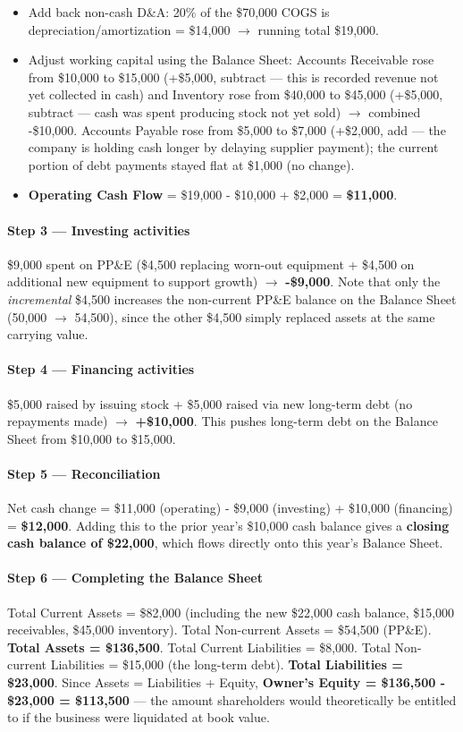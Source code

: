 \documentclass[12pt,openany]{book}
\begin{document}
\begin{itemize}[leftmargin=*]
    \item Add back non-cash D\&A: 20\% of the \$70,000 COGS is depreciation/amortization = \$14,000 \(\to\) running total \$19,000.
    \item Adjust working capital using the Balance Sheet: Accounts Receivable rose from \$10,000 to \$15,000 (+\$5,000, subtract --- this is recorded revenue not yet collected in cash) and Inventory rose from \$40,000 to \$45,000 (+\$5,000, subtract --- cash was spent producing stock not yet sold) \(\to\) combined -\$10,000. Accounts Payable rose from \$5,000 to \$7,000 (+\$2,000, add --- the company is holding cash longer by delaying supplier payment); the current portion of debt payments stayed flat at \$1,000 (no change).
    \item \textbf{Operating Cash Flow} = \$19,000 - \$10,000 + \$2,000 = \textbf{\$11,000}.
\end{itemize}

\paragraph{Step 3 --- Investing activities} \$9,000 spent on PP\&E (\$4,500 replacing worn-out equipment + \$4,500 on additional new equipment to support growth) \(\to\) \textbf{-\$9,000}. Note that only the \emph{incremental} \$4,500 increases the non-current PP\&E balance on the Balance Sheet (50,000 \(\to\) 54,500), since the other \$4,500 simply replaced assets at the same carrying value.

\paragraph{Step 4 --- Financing activities} \$5,000 raised by issuing stock + \$5,000 raised via new long-term debt (no repayments made) \(\to\) \textbf{+\$10,000}. This pushes long-term debt on the Balance Sheet from \$10,000 to \$15,000.

\paragraph{Step 5 --- Reconciliation} Net cash change = \$11,000 (operating) - \$9,000 (investing) + \$10,000 (financing) = \textbf{\$12,000}. Adding this to the prior year's \$10,000 cash balance gives a \textbf{closing cash balance of \$22,000}, which flows directly onto this year's Balance Sheet.

\paragraph{Step 6 --- Completing the Balance Sheet} Total Current Assets = \$82,000 (including the new \$22,000 cash balance, \$15,000 receivables, \$45,000 inventory). Total Non-current Assets = \$54,500 (PP\&E). \textbf{Total Assets = \$136,500}. Total Current Liabilities = \$8,000. Total Non-current Liabilities = \$15,000 (the long-term debt). \textbf{Total Liabilities = \$23,000}. Since Assets = Liabilities + Equity, \textbf{Owner's Equity = \$136,500 - \$23,000 = \$113,500} --- the amount shareholders would theoretically be entitled to if the business were liquidated at book value.
\end{document}
